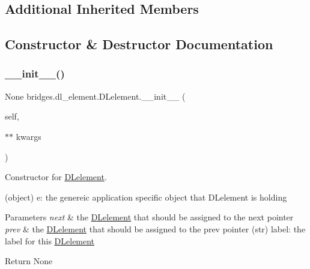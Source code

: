 \subsection*{Additional Inherited Members}


\subsection{Constructor \& Destructor Documentation}
\mbox{\label{classbridges_1_1dl__element_1_1_d_lelement_a159beec2192949eb33d5b4b6dba182ff}} 
\subsubsection{\texorpdfstring{\_\_init\_\_()}{\_\_init\_\_()}}
{\footnotesize\ttfamily  None bridges.\+dl\+\_\+element.\+D\+Lelement.\+\_\+\+\_\+init\+\_\+\+\_\+ (\begin{DoxyParamCaption}\item[{}]{self,  }\item[{$\ast$$\ast$}]{kwargs }\end{DoxyParamCaption})}



Constructor for \mbox{\hyperlink{classbridges_1_1dl__element_1_1_d_lelement}{D\+Lelement}}. 

\begin{DoxyVerb}       (object) e: the genereic application specific object that DLelement is holding
\end{DoxyVerb}
 
\begin{DoxyParams}{Parameters}
{\em next} & the \mbox{\hyperlink{classbridges_1_1dl__element_1_1_d_lelement}{D\+Lelement}} that should be assigned to the next pointer \\
\hline
{\em prev} & the \mbox{\hyperlink{classbridges_1_1dl__element_1_1_d_lelement}{D\+Lelement}} that should be assigned to the prev pointer (str) label\+: the label for this \mbox{\hyperlink{classbridges_1_1dl__element_1_1_d_lelement}{D\+Lelement}} \\
\hline
\end{DoxyParams}
\begin{DoxyParagraph}{Return}
None 
\end{DoxyParagraph}


